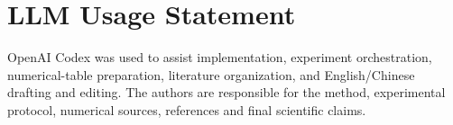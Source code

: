 \section*{LLM Usage Statement}
OpenAI Codex was used to assist implementation, experiment orchestration, numerical-table preparation, literature organization, and English/Chinese drafting and editing. The authors are responsible for the method, experimental protocol, numerical sources, references and final scientific claims.
